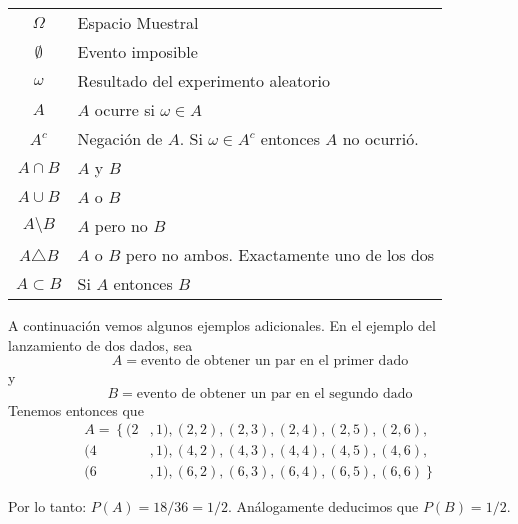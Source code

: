 \documentclass[14pt]{extreport}
\theoremstyle{definicion}
\theoremstyle{propiedad}
\begin{document}
\begin{table}
  \centering
  \begin{tabular}{|c|l|}
    \hline
    $\Omega$       & Espacio Muestral                                              \\
    $\emptyset$    & Evento imposible                                              \\
    $\omega$       & Resultado del experimento aleatorio                           \\
    $A$            & $A$ ocurre si $\omega \in A$                                  \\
    $A^c$          & Negación de $A$. Si $\omega \in A^c$ entonces $A$ no ocurrió. \\
    $A\cap B$      & $A$ y $B$                                                     \\
    $A\cup B$      & $A$ o $B$                                                     \\
    $A\setminus B$ & $A$ pero no $B$                                               \\
    $A\triangle B$ & $A$ o $B$ pero no ambos. Exactamente uno de los dos           \\
    $A\subset B$   & Si $A$ entonces $B$                                           \\
    \hline
  \end{tabular}
\end{table}
A continuación vemos algunos ejemplos adicionales. En el ejemplo del lanzamiento de dos dados, sea
$$
  A = \text{evento de obtener un par en el primer dado}
$$
y
$$
  B = \text{evento de obtener un par en el segundo dado}
$$
Tenemos entonces que
\begin{equation*}
  \begin{split}
    A = \left\{\right.(2&, 1), (2, 2), (2, 3), (2, 4), (2, 5), (2,6),  \\
    (4&, 1), (4, 2), (4, 3), (4, 4), (4, 5), (4, 6), \\
    (6&, 1), (6, 2), (6, 3), (6, 4), (6, 5), (6, 6)   \left.\right\}
  \end{split}
\end{equation*}

Por lo tanto: $P(A) = 18/36 = 1/2$. Análogamente deducimos que $P(B) = 1/2$.
\end{document}
